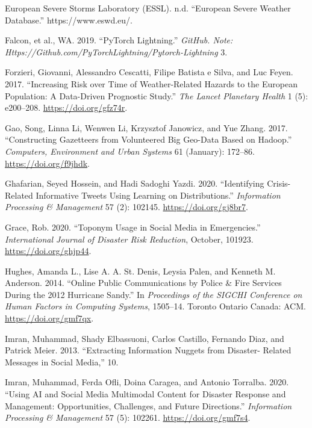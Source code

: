 \documentclass[a4paper, notitlepage]{extreport}
\newlength{\cslhangindent}
\newenvironment{CSLReferences}[2] %
 {%
  \setlength{\parindent}{0pt}
  \ifodd #1 \everypar{\setlength{\hangindent}{\cslhangindent}}\ignorespaces\fi
  \ifnum #2 > 0
  \setlength{\parskip}{#2\baselineskip}
  \fi
 }%
 {}
\begin{document}
\begin{CSLReferences}{1}{0}
\leavevmode{}%
European Severe Storms Laboratory (ESSL). n.d. {``European {Severe
Weather Database}.''} https://www.eswd.eu/.

\leavevmode{}%
Falcon, et al., WA. 2019. {``{PyTorch} Lightning.''} \emph{GitHub. Note:
Https://Github.com/PyTorchLightning/Pytorch-Lightning} 3.

\leavevmode{}%
Forzieri, Giovanni, Alessandro Cescatti, Filipe Batista e Silva, and Luc
Feyen. 2017. {``Increasing Risk over Time of Weather-Related Hazards to
the {European} Population: A Data-Driven Prognostic Study.''} \emph{The
Lancet Planetary Health} 1 (5): e200--208. \url{https://doi.org/gfz74r}.

\leavevmode{}%
Gao, Song, Linna Li, Wenwen Li, Krzysztof Janowicz, and Yue Zhang. 2017.
{``Constructing Gazetteers from Volunteered {Big Geo}-{Data} Based on
{Hadoop}.''} \emph{Computers, Environment and Urban Systems} 61
(January): 172--86. \url{https://doi.org/f9jhdk}.

\leavevmode{}%
Ghafarian, Seyed Hossein, and Hadi Sadoghi Yazdi. 2020. {``Identifying
Crisis-Related Informative Tweets Using Learning on Distributions.''}
\emph{Information Processing \& Management} 57 (2): 102145.
\url{https://doi.org/gj8br7}.

\leavevmode{}%
Grace, Rob. 2020. {``Toponym {Usage} in {Social Media} in
{Emergencies}.''} \emph{International Journal of Disaster Risk
Reduction}, October, 101923. \url{https://doi.org/ghjp44}.

\leavevmode{}%
Hughes, Amanda L., Lise A. A. St. Denis, Leysia Palen, and Kenneth M.
Anderson. 2014. {``Online Public Communications by Police \& Fire
Services During the 2012 {Hurricane Sandy}.''} In \emph{Proceedings of
the {SIGCHI Conference} on {Human Factors} in {Computing Systems}},
1505--14. {Toronto Ontario Canada}: {ACM}. \url{https://doi.org/gmf7qx}.

\leavevmode{}%
Imran, Muhammad, Shady Elbassuoni, Carlos Castillo, Fernando Diaz, and
Patrick Meier. 2013. {``Extracting {Information Nuggets} from
{Disaster}- {Related Messages} in {Social Media},''} 10.

\leavevmode{}%
Imran, Muhammad, Ferda Ofli, Doina Caragea, and Antonio Torralba. 2020.
{``Using {AI} and {Social Media Multimodal Content} for {Disaster
Response} and {Management}: {Opportunities}, {Challenges}, and {Future
Directions}.''} \emph{Information Processing \& Management} 57 (5):
102261. \url{https://doi.org/gmf7s4}.


\end{CSLReferences}
\end{document}
